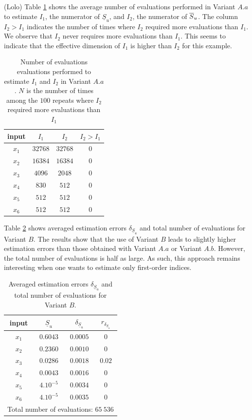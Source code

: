 {\color{purple}(Lolo) Table \ref{comparison.gfunc} shows the average number of evaluations performed in Variant $A.a$ to estimate $I_1$, the numerator of $\underline{S}_u$, and $I_2$, the numerator of $\ov{$S$}_u$. The column $I_2 > I_1$ indicates the number of times where $I_2$ required more evaluations than $I_1$. We observe that $I_2$ never requires more evaluations than $I_1$. This seems to indicate that the effective dimension of $I_1$ is higher than $I_2$ for this example.
\begin{table}[t]
\caption{Number of evaluations evaluations performed to estimate $I_1$ and $I_2$ in Variant $A.a$. $N$ is the number of times among the $100$ repeats where $I_2$ required more evaluations than $I_1$}
\centering
\begin{tabular}{cccc}
\hline
 input & $I_1$ & $I_2$ & $I_2 > I_1$ \\ \hline
 $x_1$ & $32768$ & $32768$ & $0$ \\   \hline
 $x_2$ & $16384$ & $16384$ & $0$ \\  \hline
 $x_3$ & $4096$ & $2048$ & $0$ \\  \hline
 $x_4$ & $830$ & $512$ & $0$ \\  \hline
 $x_5$ & $512$ & $512$ & $0$ \\  \hline
 $x_6$ & $512$ & $512$ & $0$ \\  \hline
\end{tabular}
\label{comparison.gfunc}
\end{table}}
\bigskip

Table \ref{res.gfunc.B} shows averaged estimation errors $\delta_{\underline{S}_u}$ and total number of evaluations for Variant $B$. The results show that the use of Variant $B$ leads to slightly higher estimation errors than those obtained with Variant $A.a$ or Variant $A.b$. However, the total number of evaluations is {\color{purple}half as large}. As such, this approach remains interesting when one wants to estimate only first-order indices.
\begin{table}[t]
\caption{Averaged estimation errors $\delta_{\underline{S}_u}$ and total number of evaluations for Variant $B$.}
\centering
\begin{tabular}{cccc}
\hline
 input & $\underline{S}_u$ & $\delta_{\underline{S}_u}$ & $r_{\delta_{\underline{S}_u}}$ \\ \hline
 $x_1$ & $0.6043$ &  $0.0005$ & $0$ \\ \hline
 $x_2$ & $0.2360$ &  $0.0010$ & $0$ \\ \hline
 $x_3$ & $0.0286$ &  $0.0018$ & $0.02$ \\ \hline
 $x_4$ & $0.0043$ &  $0.0016$ & $0$    \\ \hline
 $x_5$ & $4.10^{-5}$ & $0.0034$ & $0$  \\ \hline
 $x_6$ & $4.10^{-5}$ & $0.0035$ & $0$  \\ \hline \hline
\multicolumn{4}{l}{Total number of evaluations: $65 \ 536$}\\ \hline 
\end{tabular}
\label{res.gfunc.B}
\end{table}

